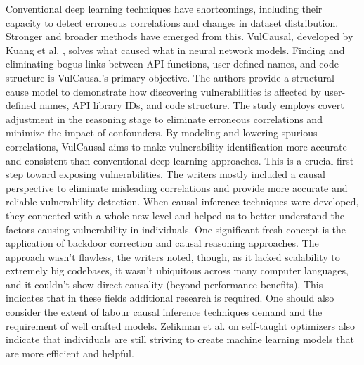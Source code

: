 \documentclass{buthesis}
\begin{document}
Conventional deep learning techniques have shortcomings, including their capacity to detect erroneous correlations and changes in dataset distribution. Stronger and broader methods have emerged from this. VulCausal, developed by Kuang et al. \cite{Kuang2024KSEM}, solves what caused what in neural network models. Finding and eliminating bogus links between API functions, user-defined names, and code structure is VulCausal's primary objective. The authors provide a structural cause model to demonstrate how discovering vulnerabilities is affected by user-defined names, API library IDs, and code structure. The study employs covert adjustment in the reasoning stage to eliminate erroneous correlations and minimize the impact of confounders. By modeling and lowering spurious correlations, VulCausal aims to make vulnerability identification more accurate and consistent than conventional deep learning approaches. This is a crucial first step toward exposing vulnerabilities. The writers mostly included a causal perspective to eliminate misleading correlations and provide more accurate and reliable vulnerability detection. When causal inference techniques were developed, they connected with a whole new level and helped us to better understand the factors causing vulnerability in individuals. One significant fresh concept is the application of backdoor correction and causal reasoning approaches. The approach wasn't flawless, the writers noted, though, as it lacked scalability to extremely big codebases, it wasn't ubiquitous across many computer languages, and it couldn't show direct causality (beyond performance benefits). This indicates that in these fields additional research is required. One should also consider the extent of labour causal inference techniques demand and the requirement of well crafted models. Zelikman et al. \cite{Zelikman2023} on self-taught optimizers also indicate that individuals are still striving to create machine learning models that are more efficient and helpful.
\end{document}
